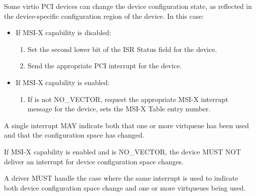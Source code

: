 Some virtio PCI devices can change the device configuration
state, as reflected in the device-specific configuration region of the device. In this case:

\begin{itemize}
  \item If MSI-X capability is disabled:
    \begin{enumerate}
    \item Set the second lower bit of the ISR Status field for the device.

    \item Send the appropriate PCI interrupt for the device.
    \end{enumerate}

  \item If MSI-X capability is enabled:
    \begin{enumerate}
    \item If  is not NO_VECTOR,
      request the appropriate MSI-X interrupt message for the
      device,  sets the MSI-X Table entry
      number.
    \end{enumerate}
\end{itemize}

A single interrupt MAY indicate both that one or more virtqueue has
been used and that the configuration space has changed.


If MSI-X capability is enabled and  is
NO_VECTOR, the device MUST NOT deliver an interrupt
for device configuration space changes.


A driver MUST handle the case where the same interrupt is used to indicate
both device configuration space change and one or more virtqueues being used.

